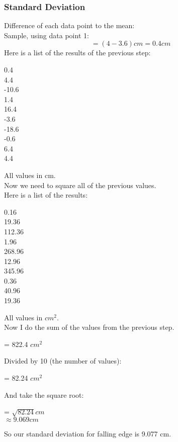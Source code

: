 \documentclass[letterpaper,12pt]{article}
\begin{document}
{\subsubsection{Standard Deviation}
Difference of each data point to the mean:\\
Sample, using data point 1:\\
\begin{equation}
=(4-3.6) cm = 0.4 cm
\end{equation}
Here is a list of the results of the previous step:
\begin{center}
0.4 \\
4.4 \\
-10.6 \\
1.4 \\
16.4 \\
-3.6 \\
-18.6 \\
-0.6 \\
6.4 \\
4.4 \\
\end{center}
All values in cm.\\
Now we need to square all of the previous values.\\
Here is a list of the results:
\begin{center}
0.16 \\
19.36 \\
112.36 \\
1.96 \\
268.96 \\
12.96 \\
345.96 \\
0.36 \\
40.96 \\
19.36 \\
\end{center}
All values in $cm^{2}$.\\
Now I do the sum of the values from the previous step.
\begin{center}
= 822.4 $cm^{2}$
\end{center}
Divided by 10 (the number of values):
\begin{center}
= 82.24 $cm^{2}$
\end{center}
And take the square root: 
\begin{center}
= $\sqrt{82.24} cm$\\
$\approx 9.069 cm$
\end{center}
So our standard deviation for falling edge is 9.077 cm.

}
\end{document}
